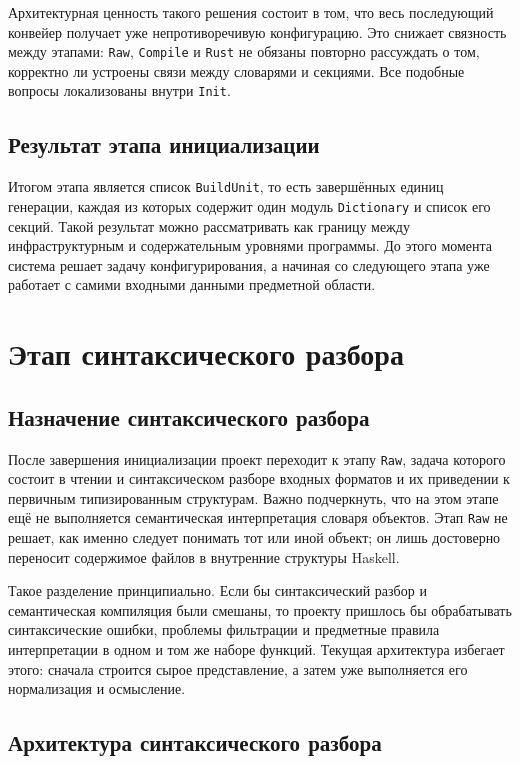 \documentclass[a4paper,12pt]{article}
\begin{document}
Архитектурная ценность такого решения состоит в том, что весь последующий конвейер
получает уже непротиворечивую конфигурацию. Это снижает связность между этапами:
\texttt{Raw}, \texttt{Compile} и \texttt{Rust} не обязаны повторно рассуждать о том,
корректно ли устроены связи между словарями и секциями. Все подобные вопросы
локализованы внутри \texttt{Init}.

\subsection{Результат этапа инициализации}

Итогом этапа является список \texttt{BuildUnit}, то есть завершённых единиц генерации,
каждая из которых содержит один модуль \texttt{Dictionary} и список его секций. Такой
результат можно рассматривать как границу между инфраструктурным и содержательным
уровнями программы. До этого момента система решает задачу конфигурирования, а начиная
со следующего этапа уже работает с самими входными данными предметной области.

\pagebreak

\section{Этап синтаксического разбора}

\subsection{Назначение синтаксического разбора}

После завершения инициализации проект переходит к этапу \texttt{Raw}, задача которого
состоит в чтении и синтаксическом разборе входных форматов и их приведении к первичным
типизированным структурам. Важно подчеркнуть, что на этом этапе ещё не выполняется
семантическая интерпретация словаря объектов. Этап \texttt{Raw} не решает, как именно
следует понимать тот или иной объект; он лишь достоверно переносит содержимое файлов в
внутренние структуры Haskell.

Такое разделение принципиально. Если бы синтаксический разбор и семантическая
компиляция были смешаны, то проекту пришлось бы обрабатывать синтаксические ошибки,
проблемы фильтрации и предметные правила интерпретации в одном и том же наборе
функций. Текущая архитектура избегает этого: сначала строится сырое представление, а
затем уже выполняется его нормализация и осмысление.

\subsection{Архитектура синтаксического разбора}
\end{document}
